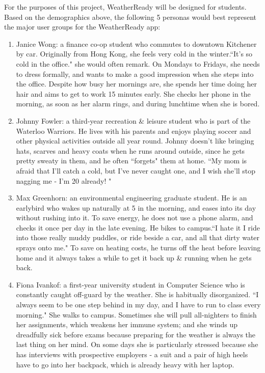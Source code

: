 \documentclass{sigchi}
\begin{document}
For the purposes of this project, WeatherReady will be designed for students. Based on the demographics above, the following 5 personas would best represent the major user groups for the WeatherReady app:

\begin{enumerate}



\item Janice Wong: a finance co-op student who commutes to downtown Kitchener by car. Originally from Hong Kong, she feels very cold in the winter.``It's so cold in the office." she would often remark. On Mondays to Fridays, she needs to dress formally, and wants to make a good impression when she steps into the office. Despite how busy her mornings are, she spends her time doing her hair and aims to get to work 15 minutes early. She checks her phone in the morning, as soon as her alarm rings, and during lunchtime when she is bored. 

\item Johnny Fowler: a third-year recreation \& leisure student who is part of the Waterloo Warriors. He lives with his parents and enjoys playing soccer and other physical activities outside all year round. Johnny doesn't like bringing hats, scarves and heavy coats when he runs around outside, since he gets pretty sweaty in them, and he often ``forgets" them at home. ``My mom is afraid that I'll catch a cold, but I've never caught one, and I wish she'll stop nagging me - I'm 20 already! "

\item Max Greenhorn: an environmental engineering graduate student. He is an earlybird who wakes up naturally at 5 in the morning, and eases into its day without rushing into it. To save energy, he does not use a phone alarm, and checks it once per day in the late evening. He bikes to campus.``I hate it I ride into those really muddy puddles, or ride beside a car, and all that dirty water sprays onto me." To save on heating costs, he turns off the heat before leaving home and it always takes a while to get it back up \& running when he gets back.

\item Fiona Ivankof: a first-year university student in Computer Science who is constantly caught off-guard by the weather. She is habitually disorganized. ``I always seem to be one step behind in my day, and I have to run to class every morning." She walks to campus. Sometimes she will pull all-nighters to finish her assignments, which weakens her immune system; and she winds up dreadfully sick before exams because preparing for the weather is always the last thing on her mind. On some days she is particularly stressed because she has interviews with prospective employers - a suit and a pair of high heels have to go into her backpack, which is already heavy with her laptop.


\end{enumerate}
\end{document}
